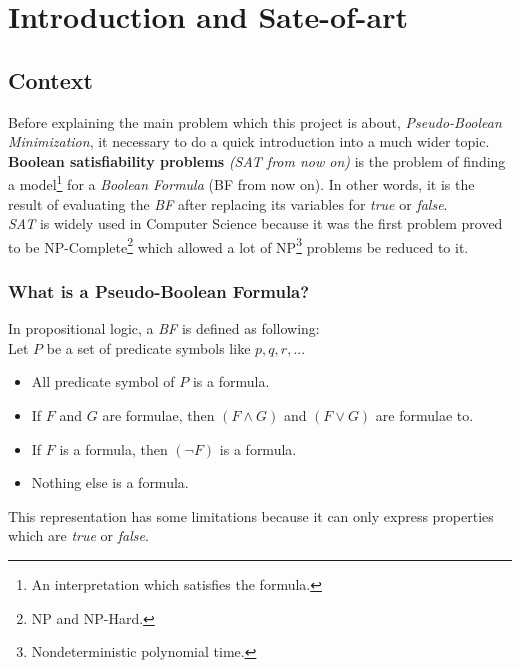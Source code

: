 \chapter{Introduction and Sate-of-art} %

\label{Chapter1} %

\section{Context}

Before explaining the main problem which this project is about, \emph{Pseudo-Boolean Minimization}, it necessary to do a quick introduction into a much wider topic.\\

\textbf{Boolean satisfiability problems} \textit{(SAT from now on)} is the problem of finding a model\footnote{An interpretation which satisfies the formula.} for a \emph{Boolean Formula} (BF from now on). In other words, it is the result of evaluating the \emph{BF} after replacing its variables for \emph{true} or \emph{false}. 
\\
\emph{SAT} is widely used in Computer Science because it was the first problem proved to be NP-Complete\cite{Cook1971}\footnote{NP and NP-Hard.} which allowed a lot of NP\footnote{Nondeterministic polynomial time.} problems be reduced to it.

\subsection{What is a Pseudo-Boolean Formula?}
In propositional logic, a \emph{BF} is defined as following\cite{Lpo}:\\
Let $P$ be a set of predicate symbols like $p,q,r,...$
\begin{itemize}
	\item All predicate symbol of $P$ is a formula.
	\item If $F$ and $G$ are formulae, then $(F \land G)$ and $(F \lor G)$ are formulae to.
	\item If $F$ is a formula, then $(\neg F)$ is a formula.
	\item Nothing else is a formula.
\end{itemize}
This representation has some limitations because it can only express properties which are \emph{true} or \emph{false}.\\

